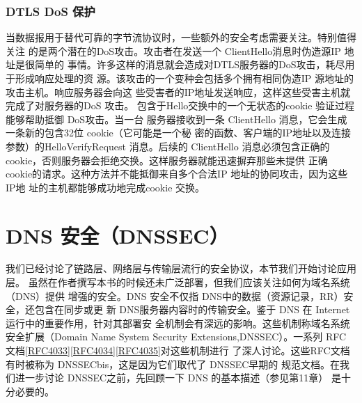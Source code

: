 \subsubsection{DTLS DoS 保护}
当数据报用于替代可靠的字节流协议时，一些额外的安全考虑需要关注。特别值得关注
的是两个潜在的DoS攻击。攻击者在发送一个 ClientHello消息时伪造源IP 地址是很简单的
事情。许多这样的消息就会造成对DTLS服务器的DoS攻击，耗尽用于形成响应处理的资
源。该攻击的一个变种会包括多个拥有相同伪造IP 源地址的攻击主机。响应服务器会向这
些受害者的IP地址发送响应，这样这些受害主机就完成了对服务器的DoS 攻击。
包含于Hello交换中的一个无状态的cookie 验证过程能够帮助抵御 DoS攻击。当一台
服务器接收到一条 ClientHello 消息，它会生成一条新的包含32位 cookie（它可能是一个秘
密的函数、客户端的IP地址以及连接参数）的HelloVerifyRequest 消息。后续的 ClientHello
消息必须包含正确的 cookie，否则服务器会拒绝交换。这样服务器就能迅速摒弃那些未提供
正确 cookie的请求。这种方法并不能抵御来自多个合法IP 地址的协同攻击，因为这些IP地
址的主机都能够成功地完成cookie 交换。

\section{DNS 安全（DNSSEC）}
我们已经讨论了链路层、网络层与传输层流行的安全协议，本节我们开始讨论应用层。
虽然在作者撰写本书的时候还未广泛部署，但我们应该关注如何为域名系统（DNS）提供
增强的安全。DNS 安全不仅指 DNS中的数据（资源记录，RR）安全，还包含在同步或更
新 DNS服务器内容时的传输安全。鉴于 DNS 在 Internet 运行中的重要作用，针对其部署安
全机制会有深远的影响。这些机制称域名系统安全扩展（Domain Name System Security
Extensions,DNSSEC）。一系列 RFC 文档\href{https://www.rfc-editor.org/rfc/rfc4033}{[RFC4033]}\href{https://www.rfc-editor.org/rfc/rfc4034}{[RFC4034]}\href{https://www.rfc-editor.org/rfc/rfc4035}{[RFC4035]}对这些机制进行
了深人讨论。这些RFC文档有时被称为 DNSSECbis，这是因为它们取代了 DNSSEC早期的
规范文档。在我们进一步讨论 DNSSEC之前，先回顾一下 DNS 的基本描述（参见第11章）
是十分必要的。

